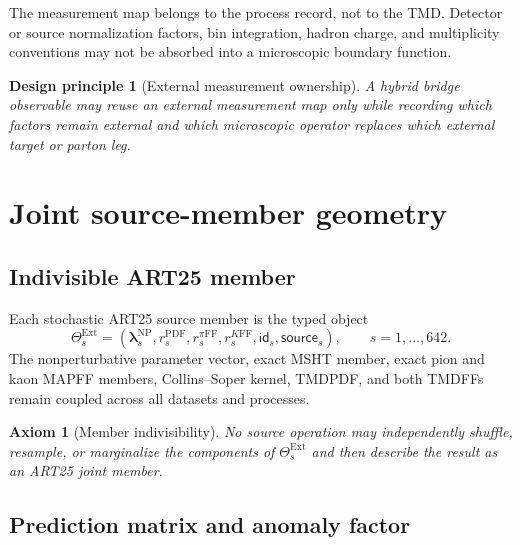 \documentclass[11pt]{article}
\newtheorem{axiom}[definition]{Axiom}
\newtheorem{principle}[definition]{Design principle}
\newcommand{\PDF}{\ensuremath{\mathrm{PDF}}}
\newcommand{\FF}{\ensuremath{\mathrm{FF}}}
\newcommand{\Ext}{\ensuremath{\mathrm{Ext}}}
\begin{document}
The measurement map belongs to the process record, not to the TMD.  Detector or source normalization factors, bin integration, hadron charge, and multiplicity conventions may not be absorbed into a microscopic boundary function.

\begin{principle}[External measurement ownership]
A hybrid bridge observable may reuse an external measurement map only while recording which factors remain external and which microscopic operator replaces which external target or parton leg.
\end{principle}

\section{Joint source-member geometry}
\label{sec:source-geometry}

\subsection{Indivisible ART25 member}

Each stochastic ART25 source member is the typed object
\begin{equation}
 \Theta_s^{\Ext}
 =
 \left(
 \bm\lambda_s^{\mathrm{NP}},
 r_s^{\PDF},
 r_s^{\pi\FF},
 r_s^{K\FF},
 \mathsf{id}_s,
 \mathsf{source}_s
 \right),
 \qquad s=1,\ldots,642.
 \label{eq:art25-member}
\end{equation}
The nonperturbative parameter vector, exact MSHT member, exact pion and kaon MAPFF members, Collins--Soper kernel, TMDPDF, and both TMDFFs remain coupled across all datasets and processes.

\begin{axiom}[Member indivisibility]
No source operation may independently shuffle, resample, or marginalize the components of \(\Theta_s^{\Ext}\) and then describe the result as an ART25 joint member.
\end{axiom}

\subsection{Prediction matrix and anomaly factor}
\end{document}
